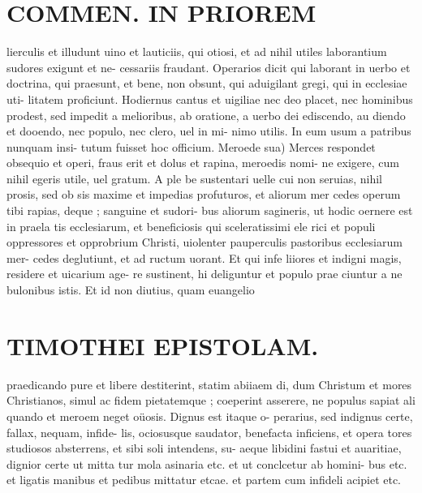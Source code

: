 \documentclass{article}
\begin{document}
\begin{pages}
\section*{COMMEN. IN PRIOREM }
\marginpar{[ p.140 ]}\pstart lierculis et illudunt uino et lauticiis, qui otiosi, et ad nihil utiles laborantium sudores exigunt et ne- cessariis fraudant. Operarios dicit qui laborant in uerbo et doctrina, qui praesunt, et bene, non obsunt, qui aduigilant gregi, qui in ecclesiae uti- litatem proficiunt. Hodiernus cantus et uigiliae nec deo placet, nec hominibus prodest, sed impedit a melioribus, ab oratione, a uerbo dei ediscendo, au diendo et dooendo, nec populo, nec clero, uel in mi- nimo utilis. In eum usum a patribus nunquam insi- tutum fuisset hoc officium.  \pend\pstart Meroede sua) Merces respondet obsequio et operi, fraus erit et dolus et rapina, meroedis nomi- ne exigere, cum nihil egeris utile, uel gratum. A ple be sustentari uelle cui non seruias, nihil prosis, sed ob sis maxime et impedias profuturos, et aliorum mer cedes operum tibi rapias, deque ; sanguine et sudori- bus aliorum sagineris, ut hodic oernere est in praela tis ecclesiarum, et beneficiosis qui sceleratissimi ele rici et populi oppressores et opprobrium Christi, uiolenter pauperculis pastoribus ecclesiarum mer- cedes deglutiunt, et ad ructum uorant. Et qui infe liiores et indigni magis, residere et uicarium age- re sustinent, hi deliguntur et populo prae ciuntur a ne bulonibus istis. Et id non diutius, quam euangelio  \pend
\section*{TIMOTHEI EPISTOLAM. }
\marginpar{[ p.141 ]}\pstart praedicando pure et libere destiterint, statim abiiaem di, dum Christum et mores Christianos, simul ac fidem pietatemque ; coeperint asserere, ne populus sapiat ali quando et meroem neget oüosis. Dignus est itaque o- perarius, sed indignus certe, fallax, nequam, infide- lis, ociosusque saudator, benefacta inficiens, et opera tores studiosos absterrens, et sibi soli intendens, su- aeque libidini fastui et auaritiae, dignior certe ut mitta tur mola asinaria etc. et ut conclcetur ab homini- bus etc. et ligatis manibus et pedibus mittatur etcae. et partem cum infideli acipiet etc.  \pend
{}
{}

\end{pages}
\end{document}
